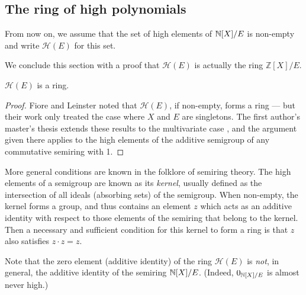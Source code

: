 \documentclass[numbers=enddot]{scrartcl}
\newcommand{\ints}{\mathbb{Z}}
\newcommand{\highring}{\mathcal{H}(E)}
\begin{document}
\subsection{The ring of high polynomials}

From now on, we assume that the set of high elements of $\mathbb{N}[X]/E$ is non-empty and write $\highring$ for this set.

We conclude this section with a proof that $\highring$ is actually the ring $\ints[X]/E$.

\begin{prop}
$\highring$ is a ring.
\end{prop}
\begin{proof}
Fiore and Leinster noted that $\highring$, if non-empty, forms a ring --- but their work only treated the case 
where $X$ and $E$ are singletons. The first author's master's thesis extends these results to the multivariate 
case \cite[Thm.4.4.3]{Lenox2026}, 
and the argument given there applies to the high elements of the additive semigroup of any 
commutative semiring with 1.
\end{proof}

\begin{rmk}
More general conditions are known in the folklore of semiring theory. The high elements of a semigroup are 
known as its \emph{kernel}, usually defined as the intersection of all ideals (absorbing sets) of the semigroup.
When non-empty, the kernel forms a group, and thus contains an element $z$ which acts as an additive identity with 
respect to those elements of the semiring that belong to the kernel. 
Then a necessary and sufficient condition for this kernel to form a ring is that $z$ also satisfies $z \cdot z = z$.
\end{rmk}

Note that the zero element (additive identity) of the ring $\highring$ is \emph{not}, in general, the additive identity of the semiring $\mathbb{N}[X]/E$.
(Indeed, $0_{\mathbb{N}[X]/E}$ is almost never high.)

\newcommand{\highzero}{0_{\highring}}


\end{document}
